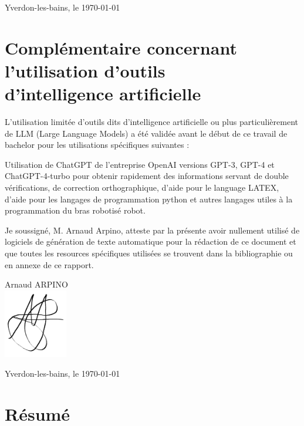 \vspace{5cm}
Yverdon-les-bains, le \today

\newpage

\clearpage
\null
\thispagestyle{empty}
\clearpage
\newpage

\vspace*{1cm}
\section*{\Huge Complémentaire concernant \\
l'utilisation d'outils\\
d'intelligence artificielle}

\vspace{2cm}

L'utilisation limitée d'outils dits d'intelligence artificielle ou plus particulièrement de
LLM (Large Language Models) a été validée avant le début de ce travail de bachelor
pour les utilisations spécifiques suivantes :

\vspace{1cm}
Utilisation de ChatGPT de l'entreprise OpenAI versions GPT-3, GPT-4 et ChatGPT-4-turbo pour
obtenir rapidement des informations servant de double vérifications, de correction
orthographique, d'aide pour le language LATEX, d'aide pour les langages de programmation python et 
autres langages utiles à la programmation du bras robotisé robot.

\vspace{1cm}
Je soussigné, M. Arnaud Arpino, atteste par la présente avoir nullement utilisé de
logiciels de génération de texte automatique pour la rédaction de ce document et
que toutes les resources spécifiques utilisées se trouvent dans la bibliographie ou en
annexe de ce rapport.

\vspace{2cm}

\hspace*{10cm}
\begin{minipage}{0.3\textwidth}
    Arnaud ARPINO\\
    \includegraphics[height=3cm]{Images/Signatures/signature Arnaud.png}
\end{minipage}

\vspace{1cm}
Yverdon-les-bains, le \today



\newpage

\clearpage
\null
\thispagestyle{empty}
\clearpage
\newpage

\section*{\Huge Résumé}

\clearpage
\null
\thispagestyle{empty}
\clearpage
\newpage